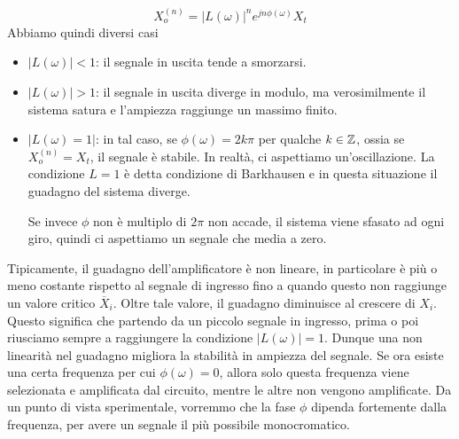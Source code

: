 \documentclass[a4paper, 11pt]{article}
\begin{document}
\[X_o^{(n)}=|L(\omega)|^ne^{jn\phi(\omega)}X_t\]
Abbiamo quindi diversi casi
\begin{itemize}
	\item $|L(\omega)|<1$: il segnale in uscita tende a smorzarsi.
	\item $|L(\omega)|>1$: il segnale in uscita diverge in modulo, ma verosimilmente il sistema satura e l'ampiezza raggiunge un massimo finito.
	\item $|L(\omega)=1|$: in tal caso, se $\phi(\omega)=2k\pi$ per qualche $k\in \mathbb{Z}$, ossia se $X_o^{(n)}=X_t$, il segnale è stabile. In realtà, ci aspettiamo un'oscillazione. La condizione $L=1$ è detta condizione di Barkhausen e in questa situazione il guadagno del sistema diverge.
	
	Se invece $\phi$ non è multiplo di $2\pi$ non accade, il sistema viene sfasato ad ogni giro, quindi ci aspettiamo un segnale che media a zero.
\end{itemize}
Tipicamente, il guadagno dell'amplificatore è non lineare, in particolare è più o meno costante rispetto al segnale di ingresso fino a quando questo non raggiunge un valore critico $\overline{X}_i$. Oltre tale valore, il guadagno diminuisce al crescere di $X_i$. Questo significa che partendo da un piccolo segnale in ingresso, prima o poi riusciamo sempre a raggiungere la condizione $|L(\omega)|=1$. Dunque una non linearità nel guadagno migliora la stabilità in ampiezza del segnale. Se ora esiste una certa frequenza per cui $\phi(\omega)=0$, allora solo questa frequenza viene selezionata e amplificata dal circuito, mentre le altre non vengono amplificate. Da un punto di vista sperimentale, vorremmo che la fase $\phi$ dipenda fortemente dalla frequenza, per avere un segnale il più possibile monocromatico.
\end{document}
